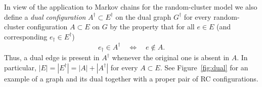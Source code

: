 \documentclass{dis}
\theoremstyle{citing}
\begin{document}
In view of the application to Markov chains for the random-cluster 
model we also define a 
\emph{dual configuration} 
$A^\dag\subset E^\dag$ on the dual graph $G^\dag$ for every 
random-cluster configuration $A\subset E$ on $G$ by the 
property that for all $e\in E$ 
(and corresponding $e_\dag\in E^\dag$)
\begin{equation}\label{eq:dual-conf}
e_\dag\in A^\dag \quad\iff\quad e\notin A.
\end{equation}
Thus, a dual edge is present in $A^\dag$ whenever the original one 
is absent in $A$. 
In particular, ${\left\vert {E} \right\vert}={\left\vert {E^\dag} \right\vert}={\left\vert {A} \right\vert}+{\left\vert {A^\dag} \right\vert}$ for 
every $A\subset E$.
See Figure~\ref{fig:dual} for an example of a graph and its dual 
together with a proper pair of RC configurations.
\end{document}
